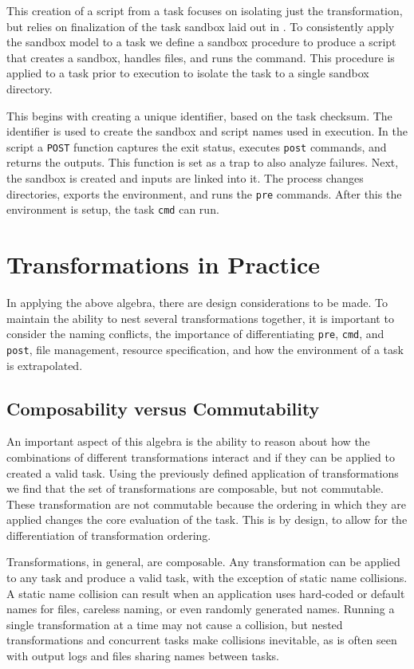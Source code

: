 \documentclass[conference]{IEEEtran}
\begin{document}
This creation of a script from a task
focuses on isolating just the transformation,
but relies on finalization of the task sandbox
laid out in .
To consistently apply the sandbox model to a task
we define a sandbox procedure to produce a script
that creates a sandbox, handles files, and runs
the command. This procedure is applied to a 
task prior to execution to isolate the task to 
a single sandbox directory.

This begins with 
creating a unique identifier, based on the task checksum.
The identifier is used to create the 
sandbox and script names used in execution. In the 
script a {\tt POST} function captures
the exit status, executes {\tt post} commands, and
returns the outputs. 
This function is set as a trap to
also analyze failures.
Next, the sandbox is created and 
inputs are linked into it. 
The process changes directories,
exports the environment, and
runs the {\tt pre} commands.
After this the environment is setup,
the task {\tt cmd} can run.


\section{Transformations in Practice}

In applying the above algebra, there are
design considerations to be made.
To maintain the ability to nest several
transformations together, it is important
to consider the naming conflicts, the
importance of differentiating {\tt pre},
{\tt cmd}, and {\tt post}, file management,
resource specification, and how the 
environment of a task is extrapolated.

\subsection{ Composability versus Commutability }
An important aspect of this algebra is the ability
to reason about how the combinations of
different transformations interact and if they 
can be applied to created a valid task.
Using the previously defined application of
transformations we find that the set of transformations
are composable, but not commutable.
These transformation are not commutable because
the ordering in which they are applied changes the core 
evaluation of the task.
This is by design, to allow for the differentiation
of transformation ordering.

Transformations, in general, are composable.
Any transformation can be
applied to any task and produce a valid task,
with the exception of static name collisions.
A static name collision can result when
an application uses hard-coded or 
default names for files, 
careless naming, or even randomly
generated names.
Running a single transformation at a time 
may not cause a collision,
but nested transformations and concurrent tasks 
make collisions inevitable, 
as is often seen with output logs
and files sharing names between tasks.
\end{document}
